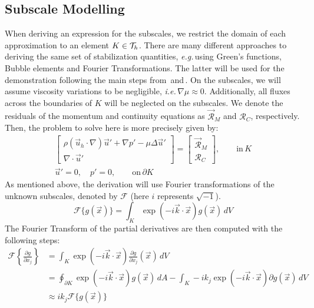 \subsection{Subscale Modelling}\label{chap2:sec2:subsec3}
When deriving an expression for the subscales, we restrict the domain of each approximation to an element $K\in\mathcal{T}_h$. There are many different approaches to deriving the same set of stabilization quantities, \textit{e.g.}\,using Green's functions, Bubble elements and Fourier Transformations. The latter will be used for the demonstration following the main steps from\,\cite{Principe2010} and\,\cite{Codina2002}. On the subscales, we will assume viscosity variations to be negligible, \textit{i.e.}\,$\nabla\mu\approx0$. Additionally, all fluxes across the boundaries of $K$ will be neglected on the subscales. We denote the residuals of the momentum and continuity equations as $\vec{\mathcal{R}}_M$ and $\mathcal{R}_C$, respectively. Then, the problem to solve here is more precisely given by:
\begin{equation}
	\begin{split}
		\begin{bmatrix}
			\rho(\vec{u}_{h}\cdot\nabla)\vec{u}' + \nabla p' - \mu\Delta\vec{u}' \\
			\nabla \cdot \vec{u}'
		\end{bmatrix}
		= \begin{bmatrix}
			\vec{\mathcal{R}}_M \\
			\mathcal{R}_C
		\end{bmatrix},\qquad \text{in}\, K\\[1em]
		\vec{u}' = 0,\quad p' = 0,\qquad \text{on}\, \partial K
	\end{split}
	\label{eqn:subscale_problem}
\end{equation}
As mentioned above, the derivation will use Fourier transformations of the unknown subscales, denoted by $\mathcal{F}$ (here $i$ represents $\sqrt{-1}$).
\begin{equation*}
	\mathcal{F}\{g(\vec x)\} = \int_{K} \exp{(-i\vec{k}\cdot\vec{x})} g(\vec{x})\,dV
\end{equation*}
The Fourier Transform of the partial derivatives are then computed with the following steps:
\begin{equation}
	\begin{split}
		\mathcal{F}\left\{\frac{\partial g}{\partial x_j}\right\} &= \int_{K} \exp{(-i\vec{k}\cdot\vec{x})} \frac{\partial g}{\partial x_j}(\vec{x})\,dV\\[1em]
		&= \oint_{\partial K} \exp{(-i\vec{k}\cdot\vec{x})} g(\vec{x})\,dA - \int_{K} -ik_j\exp{(-i\vec{k}\cdot\vec{x})} \partial g(\vec{x})\,dV\\[1em]
		&\approx ik_j \mathcal{F}\{g(\vec x)\}\\
	\end{split}
\end{equation}
